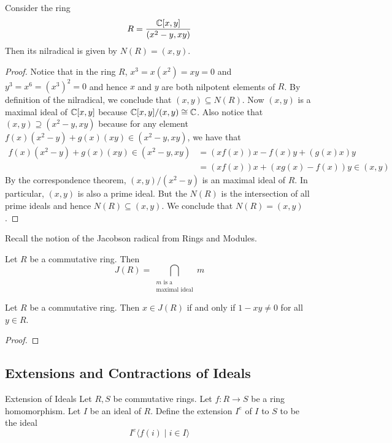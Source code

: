 \documentclass[a4paper]{article}
\begin{document}
\begin{eg}{}{} Consider the ring $$R=\frac{\mathbb{C}[x,y]}{(x^2-y,xy)}$$ Then its nilradical is given by $N(R)=(x,y)$. \tcbline
\begin{proof}
Notice that in the ring $R$, $x^3=x(x^2)=xy=0$ and $y^3=x^6=(x^3)^2=0$ and hence $x$ and $y$ are both nilpotent elements of $R$. By definition of the nilradical, we conclude that $(x,y)\subseteq N(R)$. Now $(x,y)$ is a maximal ideal of $\mathbb{C}[x,y]$ because $\mathbb{C}[x,y]/(x,y)\cong\mathbb{C}$. Also notice that $(x,y)\supseteq(x^2-y,xy)$ because for any element $f(x)(x^2-y)+g(x)(xy)\in(x^2-y,xy)$, we have that 
\begin{align*}
f(x)(x^2-y)+g(x)(xy)\in(x^2-y,xy)&=(xf(x))x-f(x)y+(g(x)x)y\\
&=(xf(x))x+(xg(x)-f(x))y\in (x,y)
\end{align*}
By the correspondence theorem, $(x,y)/(x^2-y)$ is an maximal ideal of $R$. In particular, $(x,y)$ is also a prime ideal. But the $N(R)$ is the intersection of all prime ideals and hence $N(R)\subseteq(x,y)$. We conclude that $N(R)=(x,y)$. 
\end{proof}
\end{eg}

Recall the notion of the Jacobson radical from Rings and Modules. 

\begin{prp}{}{} Let $R$ be a commutative ring. Then $$J(R)=\bigcap_{\substack{m\text{ is a}\\\text{maximal ideal}}}m$$
\end{prp}

\begin{prp}{}{} Let $R$ be a commutative ring. Then $x\in J(R)$ if and only if $1-xy\neq 0$ for all $y\in R$. \tcbline
\begin{proof}
\end{proof}
\end{prp}

\subsection{Extensions and Contractions of Ideals}
\begin{defn}{Extension of Ideals}{} Let $R,S$ be commutative rings. Let $f:R\to S$ be a ring homomorphism. Let $I$ be an ideal of $R$. Define the extension $I^e$ of $I$ to $S$ to be the ideal $$I^e\langle f(i)\;|\;i\in I\rangle$$
\end{defn}
\end{document}
